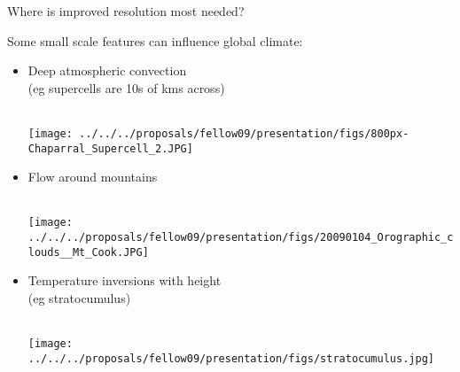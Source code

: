 \begin{slide}{Where is improved resolution most needed?}

\vspace{6pt}
{\Large Some small scale features can influence global climate:}
\vspace{6pt}

\begin{itemize}
\item
\begin{minipage}[t]{0.55\linewidth}\Large
Deep atmospheric convection \\(eg supercells are 10s of kms across)
\end{minipage}
\parbox[t]{0.3\linewidth}{\ \\ \vspace{-48pt} \vfill
\texttt{[image: ../../../proposals/fellow09/presentation/figs/800px-Chaparral\_Supercell\_2.JPG]}
}

\item
\begin{minipage}[t]{0.55\linewidth}\Large
\Large Flow around mountains
\end{minipage}
\parbox[t]{0.3\linewidth}{\ \\ \vspace{-48pt} \vfill
\texttt{[image: ../../../proposals/fellow09/presentation/figs/20090104\_Orographic\_clouds\_\_Mt\_Cook.JPG]}
}

\item
\begin{minipage}[t]{0.55\linewidth}\Large
Temperature inversions with height \\(eg stratocumulus)
\end{minipage}
\parbox[t]{0.3\linewidth}{\ \\ \vspace{-48pt} \vfill
\texttt{[image: ../../../proposals/fellow09/presentation/figs/stratocumulus.jpg]}
}

\end{itemize}

\end{slide}

